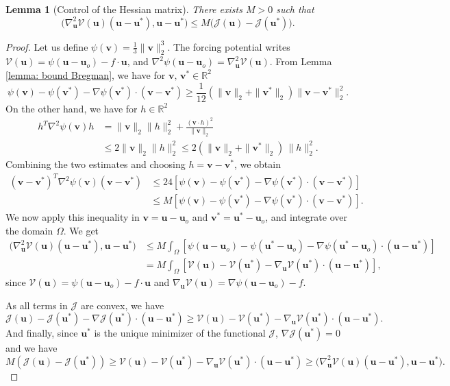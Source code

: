 \documentclass[11pt]{article}
\newtheorem{lemma}[theorem]{Lemma}
\newcommand{\bu}{\mathbf{u}}
\newcommand{\bv}{\mathbf{v}}
\begin{document}
\begin{lemma}[Control of the Hessian matrix]
\label{lemma: control hessian}
There exists $M>0$ such that
$$
    \bigl(\nabla^2_{\bu}\mathcal V(\bu)(\bu-\bu^*),\bu-\bu^*\bigr)
    \leq
    M\bigl(\mathcal J(\bu)-\mathcal J(\bu^*)\bigr).
$$
\end{lemma}
\begin{proof} Let us define $\psi(\bv)=\frac13 \|\bv\|_2^3$. The forcing potential writes $\mathcal{V}(\bu) = \psi(\bu-\bu_o)- f\cdot \bu$, and $\nabla^2\psi(\bu-\bu_o) = \nabla^2_\bu\mathcal{V}(\bu)$.
From Lemma \ref{lemma: bound Bregman}, we have for $\bv,\, \bv^* \in \mathbb{R}^2$
$$
\psi(\bv)-\psi(\bv^*)-\nabla\psi(\bv^*)\cdot(\bv-\bv^*)
    \geq
    \frac1{12}
    \left (\|\bv\|_2+\|\bv^*\|_2\right )\|\bv -\bv^*\|_2^2.
$$
On the other hand, we have for $h \in \mathbb{R}^2$
\[
\begin{aligned}
    h^T\nabla^2\psi(\bv)h
    &=
    \|\bv\|_2 \|h\|_2^2+\frac{(\bv \cdot h)^2}{\|\bv\|_2}  \\
    &\leq
    2 \|\bv\|_2 \|h\|_2^2 \leq
    2(\|\bv\|_2 + \|\bv^*\|_2)\, \|h\|_2^2.
\end{aligned}
\]
Combining the two estimates and choosing $h = \bv-\bv^*$, we obtain
\[\begin{aligned}
    (\bv-\bv^*)^T\nabla^2\psi(\bv)(\bv-\bv^*) &\leq 24 \left [\psi(\bv)-\psi(\bv^*)-\nabla\psi(\bv^*)\cdot(\bv-\bv^*)\right ] \\
    &\leq M \left [\psi(\bv)-\psi(\bv^*)-\nabla\psi(\bv^*)\cdot(\bv-\bv^*)\right ].
    \end{aligned}
\]
We now apply this inequality in $\bv=\bu-\bu_o$ and $\bv^*=\bu^*-\bu_o$, and integrate over the domain $\Omega$. We get
\[\begin{aligned}
    \bigl(\nabla^2_\bu\mathcal{V}(\bu)(\bu-\bu^*),\bu-\bu^*\bigr)
    &\leq
    M
    \int_\Omega \left [\psi(\bu-\bu_o)-\psi(\bu^*-\bu_o)-\nabla\psi(\bu^*-\bu_o)\cdot(\bu-\bu^*)\right ]\\
    &= M
    \int_\Omega \left [\mathcal{V}(\bu)-\mathcal{V}(\bu^*)-\nabla_{\bu}\mathcal{V}(\bu^*)\cdot(\bu-\bu^*)\right ],
\end{aligned}
\]since $\mathcal{V}(\bu) = \psi(\bu-\bu_o)- f\cdot \bu$ and $\nabla_{\bu}\mathcal{V}(\bu) =\nabla\psi(\bu-\bu_o)-f $.

\noindent As all terms in \(\mathcal J\) are convex, we have 
$$ \mathcal{J}(\bu)-\mathcal{J}(\bu^*)-\nabla \mathcal{J}(\bu^*)\cdot(\bu-\bu^*) \ge 
\mathcal{V}(\bu)-\mathcal{V}(\bu^*)-\nabla_{\bu}\mathcal{V}(\bu^*)\cdot(\bu-\bu^*).$$ And finally, since $\bu^*$ is the unique minimizer of the functional $\mathcal{J}$, $\nabla \mathcal{J}(\bu^*)=0$ and we have
$$ M \left(\mathcal{J}(\bu)-\mathcal{J}(\bu^*)\right) \ge 
\mathcal{V}(\bu)-\mathcal{V}(\bu^*)-\nabla_{\bu}\mathcal{V}(\bu^*)\cdot(\bu-\bu^*)\ge \bigl(\nabla^2_\bu\mathcal{V}(\bu)(\bu-\bu^*),\bu-\bu^*\bigr).$$
\end{proof}
\end{document}
